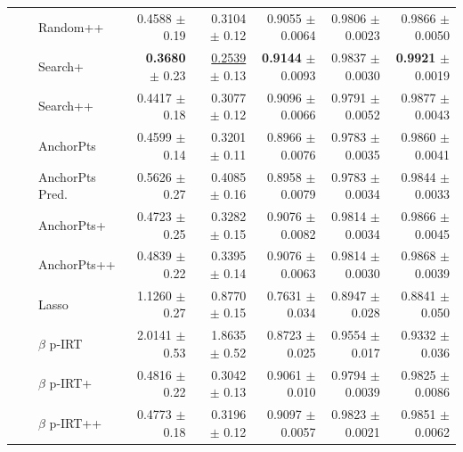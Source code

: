 \begin{longtable}{llp{}rrrrr}
 &  & Random++ & 0.4588 {\scriptsize $\pm$ 0.19} & 0.3104 {\scriptsize $\pm$ 0.12} & 0.9055 {\scriptsize $\pm$ 0.0064} & 0.9806 {\scriptsize $\pm$ 0.0023} & 0.9866 {\scriptsize $\pm$ 0.0050} \\
 &  & Search+ & \textbf{0.3680} {\scriptsize $\pm$ 0.23} & \underline{0.2539} {\scriptsize $\pm$ 0.13} & \textbf{0.9144} {\scriptsize $\pm$ 0.0093} & 0.9837 {\scriptsize $\pm$ 0.0030} & \textbf{0.9921} {\scriptsize $\pm$ 0.0019} \\
 &  & Search++ & 0.4417 {\scriptsize $\pm$ 0.18} & 0.3077 {\scriptsize $\pm$ 0.12} & 0.9096 {\scriptsize $\pm$ 0.0066} & 0.9791 {\scriptsize $\pm$ 0.0052} & 0.9877 {\scriptsize $\pm$ 0.0043} \\
 &  & AnchorPts & 0.4599 {\scriptsize $\pm$ 0.14} & 0.3201 {\scriptsize $\pm$ 0.11} & 0.8966 {\scriptsize $\pm$ 0.0076} & 0.9783 {\scriptsize $\pm$ 0.0035} & 0.9860 {\scriptsize $\pm$ 0.0041} \\
 &  & AnchorPts Pred. & 0.5626 {\scriptsize $\pm$ 0.27} & 0.4085 {\scriptsize $\pm$ 0.16} & 0.8958 {\scriptsize $\pm$ 0.0079} & 0.9783 {\scriptsize $\pm$ 0.0034} & 0.9844 {\scriptsize $\pm$ 0.0033} \\
 &  & AnchorPts+ & 0.4723 {\scriptsize $\pm$ 0.25} & 0.3282 {\scriptsize $\pm$ 0.15} & 0.9076 {\scriptsize $\pm$ 0.0082} & 0.9814 {\scriptsize $\pm$ 0.0034} & 0.9866 {\scriptsize $\pm$ 0.0045} \\
 &  & AnchorPts++ & 0.4839 {\scriptsize $\pm$ 0.22} & 0.3395 {\scriptsize $\pm$ 0.14} & 0.9076 {\scriptsize $\pm$ 0.0063} & 0.9814 {\scriptsize $\pm$ 0.0030} & 0.9868 {\scriptsize $\pm$ 0.0039} \\
 &  & Lasso & 1.1260 {\scriptsize $\pm$ 0.27} & 0.8770 {\scriptsize $\pm$ 0.15} & 0.7631 {\scriptsize $\pm$ 0.034} & 0.8947 {\scriptsize $\pm$ 0.028} & 0.8841 {\scriptsize $\pm$ 0.050} \\
 &  & $\beta$ p-IRT & 2.0141 {\scriptsize $\pm$ 0.53} & 1.8635 {\scriptsize $\pm$ 0.52} & 0.8723 {\scriptsize $\pm$ 0.025} & 0.9554 {\scriptsize $\pm$ 0.017} & 0.9332 {\scriptsize $\pm$ 0.036} \\
 &  & $\beta$ p-IRT+ & 0.4816 {\scriptsize $\pm$ 0.22} & 0.3042 {\scriptsize $\pm$ 0.13} & 0.9061 {\scriptsize $\pm$ 0.010} & 0.9794 {\scriptsize $\pm$ 0.0039} & 0.9825 {\scriptsize $\pm$ 0.0086} \\
 &  & $\beta$ p-IRT++ & 0.4773 {\scriptsize $\pm$ 0.18} & 0.3196 {\scriptsize $\pm$ 0.12} & 0.9097 {\scriptsize $\pm$ 0.0057} & 0.9823 {\scriptsize $\pm$ 0.0021} & 0.9851 {\scriptsize $\pm$ 0.0062} \\

\end{longtable}
